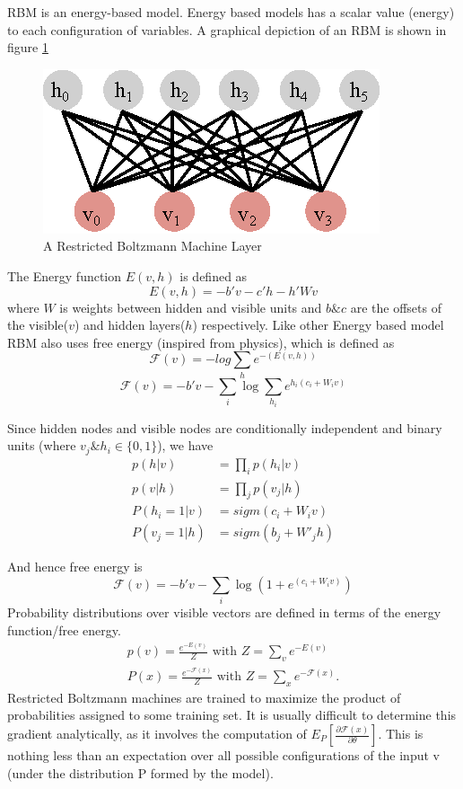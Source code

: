 RBM is an energy-based model. Energy based models has a scalar value (energy) to each configuration of variables. A graphical depiction of an RBM is shown in figure \ref{fig:rbm_layer}
\begin{figure}[!ht]
    \centering
    \includegraphics[scale=0.9]{./imgs/rbm.eps}
    \caption{A Restricted Boltzmann Machine Layer}
    \label{fig:rbm_layer}
\end{figure}%

The Energy function $E(v,h)$ is defined as 
$$E(v,h) = - b'v - c'h - h'Wv$$
where $W$ is weights between hidden and visible units and $b \& c$  are the offsets of the visible($v$) and hidden layers($h$) respectively. Like other Energy based model RBM also uses free energy (inspired from physics), which is defined as
$$\mathcal{F}(v) = -log \sum_{h}{e^{-(E(v,h))}}  $$
$$\mathcal{F}(v) = - b'v - \sum_i \log \sum_{h_i} e^{h_i (c_i + W_i v)}$$

Since hidden nodes and visible nodes are conditionally independent and binary units (where $v_j \& h_i \in \{0,1\}$), we have 
\begin{align}
p(h|v) &= \prod_i p(h_i|v) \\
p(v|h) &= \prod_j p(v_j|h) \\
P(h_i=1|v) &= sigm(c_i + W_i v) \label{eq:rbm_layers_prob1} \\
P(v_j=1|h) &= sigm(b_j + W'_j h) \label{eq:rbm_layers_prob2}  
\end{align}

And hence free energy is 
$$\mathcal{F}(v)= - b'v - \sum_i \log(1 + e^{(c_i + W_i v)})$$ %
Probability distributions over visible vectors are defined in terms of the energy function/free energy.
\begin{align*} 
p(v) = \frac {e^{-E(v)}} {Z} \text{ with } Z = \sum_v e^{-E(v)} \\
P(x) = \frac{e^{-\mathcal{F}(x)}}{Z} \text{ with } Z=\sum_x e^{-\mathcal{F}(x)}.
\end{align*}
Restricted Boltzmann machines are trained to maximize the product of probabilities assigned to some training set. It is usually difficult to determine this gradient analytically, as it involves the computation of $E_P[\frac{\partial \mathcal{F}(x)} {\partial \theta} ]$. This is nothing less than an expectation over all possible configurations of the input v (under the distribution P formed by the model). \cite{hinton2010practical}

